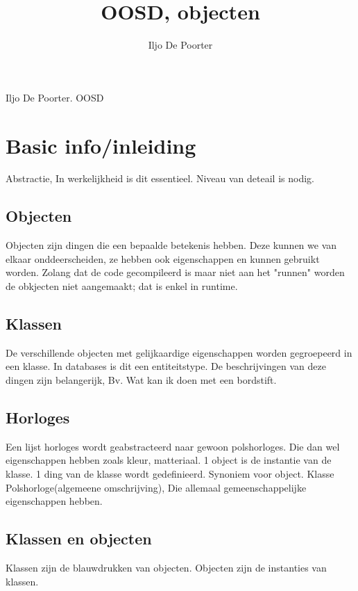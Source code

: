 \documentclass{article}
\renewcommand{\maketitle}{
\begin{center}
{\huge\bfseries
\theauthor}

\vspace{.25em}
Iljo De Poorter. OOSD
\end{center}
}
\begin{document}
\title{OOSD, objecten}
\author{Iljo De Poorter}
\maketitle
\section{Basic info/inleiding}
Abstractie, In werkelijkheid is dit essentieel. 
Niveau van deteail is nodig.
\subsection{Objecten}
Objecten zijn dingen die een bepaalde betekenis hebben.
Deze kunnen we van elkaar onddeerscheiden, ze hebben ook eigenschappen en kunnen gebruikt worden.
Zolang dat de code gecompileerd is maar niet aan het "runnen" worden de obkjecten niet aangemaakt; dat is enkel in runtime.
\subsection{Klassen}
De verschillende objecten met gelijkaardige eigenschappen worden gegroepeerd in een klasse. In databases is dit een entiteitstype.
De beschrijvingen van deze dingen zijn belangerijk, Bv. Wat kan ik doen met een bordstift.
\subsection{Horloges}
Een lijst horloges wordt geabstracteerd naar gewoon polshorloges. Die dan wel eigenschappen hebben zoals kleur, matteriaal.
1 object is de instantie van de klasse. 1 ding van de klasse wordt gedefinieerd. Synoniem voor object. Klasse Polshorloge(algemeene omschrijving), Die allemaal gemeenschappelijke eigenschappen hebben.

\subsection{Klassen en objecten}
Klassen zijn de blauwdrukken van objecten. Objecten zijn de instanties van klassen.
\end{document}
